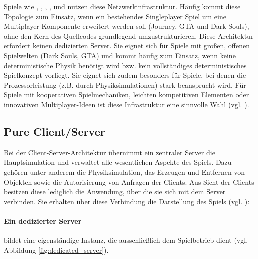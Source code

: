 Spiele wie , , , ,  und  nutzen diese Netzwerkinfrastruktur. Häufig kommt diese Topologie zum Einsatz, wenn ein bestehendes Singleplayer Spiel um eine Multiplayer-Komponente erweitert werden soll (Journey, GTA und Dark Souls), ohne den Kern des Quellcodes grundlegend umzustrukturieren. Diese Architektur erfordert keinen dedizierten Server. Sie eignet sich für Spiele mit großen, offenen Spielwelten (Dark Souls, GTA) und kommt häufig zum Einsatz, wenn keine deterministische Physik benötigt wird bzw. kein vollständiges deterministisches Spielkonzept vorliegt. Sie eignet sich zudem besonders für Spiele, bei denen die Prozessorleistung (z.B. durch Physiksimulationen) stark beansprucht wird. Für Spiele mit kooperativen Spielmechaniken, leichten kompetitiven Elementen oder innovativen Multiplayer-Ideen ist diese Infrastruktur eine sinnvolle Wahl (vgl. \citealp{noauthor_choosing_2024}).

\subsection{Pure Client/Server}
Bei der Client-Server-Architektur übernimmt ein zentraler Server die Hauptsimulation und verwaltet alle wesentlichen Aspekte des Spiels. Dazu gehören unter anderem die Physiksimulation, das Erzeugen und Entfernen von Objekten sowie die Autorisierung von Anfragen der Clients. Aus Sicht der Clients besitzen diese lediglich die Anwendung, über die sie sich mit dem Server verbinden. Sie erhalten über diese Verbindung die Darstellung des Spiels (vgl. \citealp{noauthor_client-server_2024}):
\paragraph{Ein dedizierter Server} bildet eine eigenständige Instanz, die ausschließlich dem Spielbetrieb dient (vgl. Abbildung \ref{fig:dedicated_server}).

